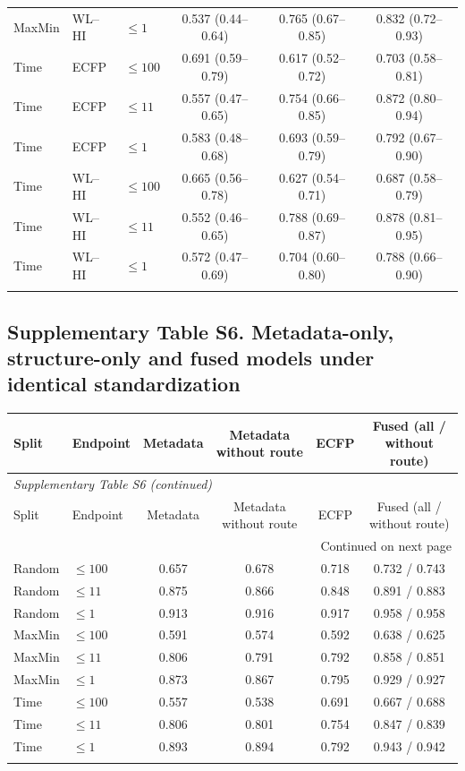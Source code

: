 \begin{longtable}{lllccc}
MaxMin & WL--HI & $\leq1$ & 0.537 (0.44--0.64) & 0.765 (0.67--0.85) & 0.832 (0.72--0.93) \\
\addlinespace
Time & ECFP & $\leq100$ & 0.691 (0.59--0.79) & 0.617 (0.52--0.72) & 0.703 (0.58--0.81) \\
Time & ECFP & $\leq11$ & 0.557 (0.47--0.65) & 0.754 (0.66--0.85) & 0.872 (0.80--0.94) \\
Time & ECFP & $\leq1$ & 0.583 (0.48--0.68) & 0.693 (0.59--0.79) & 0.792 (0.67--0.90) \\
\addlinespace
Time & WL--HI & $\leq100$ & 0.665 (0.56--0.78) & 0.627 (0.54--0.71) & 0.687 (0.58--0.79) \\
Time & WL--HI & $\leq11$ & 0.552 (0.46--0.65) & 0.788 (0.69--0.87) & 0.878 (0.81--0.95) \\
Time & WL--HI & $\leq1$ & 0.572 (0.47--0.69) & 0.704 (0.60--0.80) & 0.788 (0.66--0.90) \\
\addlinespace
\end{longtable}
\subsection*{Supplementary Table S6. Metadata-only, structure-only and fused models under identical standardization}
\begin{longtable}{llcccc}

\toprule Split & Endpoint & Metadata & Metadata without route & ECFP & Fused (all / without route) \\ \midrule\endfirsthead
\multicolumn{6}{l}{\textit{Supplementary Table S6 (continued)}} \\
\toprule Split & Endpoint & Metadata & Metadata without route & ECFP & Fused (all / without route) \\ \midrule\endhead
\midrule\multicolumn{6}{r}{Continued on next page}\\\endfoot
\bottomrule\endlastfoot
Random & $\leq100$ & 0.657 & 0.678 & 0.718 & 0.732 / 0.743 \\
Random & $\leq11$ & 0.875 & 0.866 & 0.848 & 0.891 / 0.883 \\
Random & $\leq1$ & 0.913 & 0.916 & 0.917 & 0.958 / 0.958 \\
\addlinespace
MaxMin & $\leq100$ & 0.591 & 0.574 & 0.592 & 0.638 / 0.625 \\
MaxMin & $\leq11$ & 0.806 & 0.791 & 0.792 & 0.858 / 0.851 \\
MaxMin & $\leq1$ & 0.873 & 0.867 & 0.795 & 0.929 / 0.927 \\
\addlinespace
Time & $\leq100$ & 0.557 & 0.538 & 0.691 & 0.667 / 0.688 \\
Time & $\leq11$ & 0.806 & 0.801 & 0.754 & 0.847 / 0.839 \\
Time & $\leq1$ & 0.893 & 0.894 & 0.792 & 0.943 / 0.942 \\
\addlinespace
\end{longtable}
